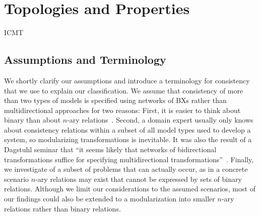 \chapter{Topologies and Properties
}
\label{chap:properties}

\begin{copiedFrom}{ICMT}

\section{Assumptions and Terminology}
\label{chap:properties:terminology}

We shortly clarify our assumptions and introduce a terminology for consistency %
that we %
use to explain our classification.
We assume that consistency of more than two types of models is specified using networks of \acp{BX} rather than multidirectional approaches for two reasons:
First, it is easier to think about binary than about $n$-ary relations~\cite{stevens2017a}.
Second, a domain expert usually only knows about consistency relations within a subset of all model types used to develop a system, so modularizing transformations is inevitable.
It was also the result of a Dagstuhl seminar that \enquote{it seems likely that networks of bidirectional transformations suffice for specifying multidirectional transformations}~\cite[p. 7]{cleve2019dagstuhl}.
Finally, we investigate of a subset of problems that can actually occur, as in a concrete scenario $n$-ary relations may exist that cannot be expressed by sets of binary relations.
Although we limit our considerations to the assumed scenarios, most of our findings could also be extended to a modularization into smaller $n$-ary relations rather than binary relations.


\end{copiedFrom}
